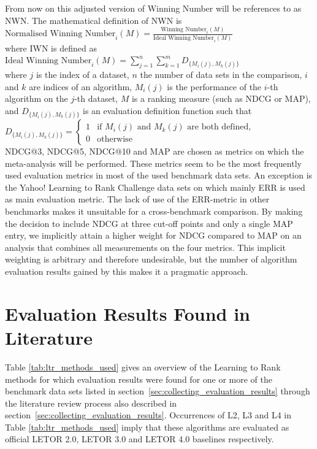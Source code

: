 From now on this adjusted version of Winning Number will be references to as \ac{NWN}. The mathematical definition of \ac{NWN} is\\

$\text{Normalised Winning Number}_i(M) = \frac{\text{Winning Number}_i(M)}{\text{Ideal Winning Number}_i(M)}$\\

\noindent
where \ac{IWN} is defined as\\

$\text{Ideal Winning Number}_i(M) = \sum\nolimits_{j=1}^n \sum\nolimits_{k=1}^m D_{\{M_i(j),M_k(j)\}}$\\

where $j$ is the index of a dataset, $n$ the number of data sets in the comparison, $i$ and $k$ are indices of an algorithm, $M_i(j)$ is the performance of the $i$-th algorithm on the $j$-th dataset, $M$ is a ranking measure (such as \ac{NDCG} or \ac{MAP}), and $D_{\{M_i(j),M_k(j)\}}$ is an evaluation definition function such that\\

$D_{\{M_i(j),M_k(j)\}} = \begin{cases}
1 & \text{if } M_i(j) \text{ and } M_k(j) \text{ are both defined}, \\
0 & \text{otherwise}
\end{cases}$\\

\ac{NDCG}@3, \ac{NDCG}@5, \ac{NDCG}@10 and \ac{MAP} are chosen as metrics on which the meta-analysis will be performed. These metrics seem to be the most frequently used evaluation metrics in most of the used benchmark data sets. An exception is the Yahoo! Learning to Rank Challenge data sets on which mainly \ac{ERR} is used as main evaluation metric. The lack of use of the \ac{ERR}-metric in other benchmarks makes it unsuitable for a cross-benchmark comparison. By making the decision to include \ac{NDCG} at three cut-off points and only a single \ac{MAP} entry, we implicitly attain a higher weight for \ac{NDCG} compared to \ac{MAP} on an analysis that combines all measurements on the four metrics. This implicit weighting is arbitrary and therefore undesirable, but the number of algorithm evaluation results gained by this makes it a pragmatic approach.

\section{Evaluation Results Found in Literature}
Table \ref{tab:ltr_methods_used} gives an overview of the Learning to Rank methods for which evaluation results were found for one or more of the benchmark data sets listed in section~\ref{sec:collecting_evaluation_results} through the literature review process also described in section~\ref{sec:collecting_evaluation_results}. Occurrences of L2, L3 and L4 in Table \ref{tab:ltr_methods_used} imply that these algorithms are evaluated as official LETOR 2.0, LETOR 3.0 and LETOR 4.0 baselines respectively.\\

